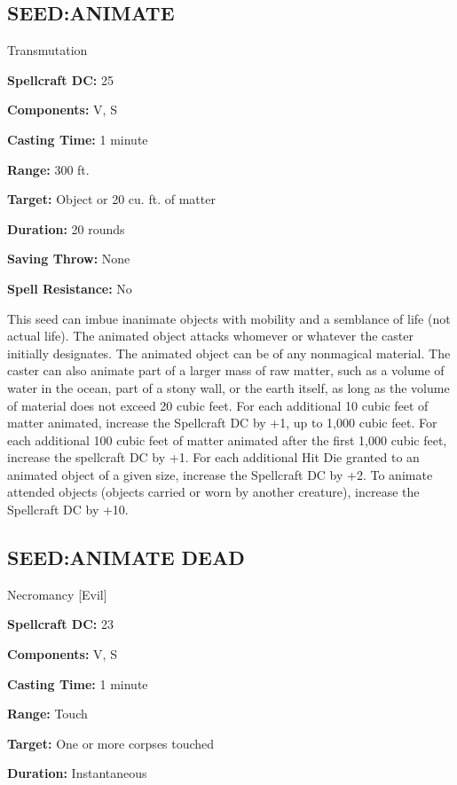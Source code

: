 \documentclass{article}
\begin{document}
\vspace{12pt}
\subsection*{SEED:ANIMATE }

Transmutation 

\textbf{Spellcraft DC:} 25 

\textbf{Components:} V, S 

\textbf{Casting Time:} 1 minute 

\textbf{Range:} 300 ft. 

\textbf{Target:} Object or 20 cu. ft. of matter 

\textbf{Duration:} 20 rounds 

\textbf{Saving Throw:} None 

\textbf{Spell Resistance:} No 

This seed can imbue inanimate objects with mobility and a semblance of life (not 
actual life). The animated object attacks whomever or whatever the caster initially 
designates. The animated object can be of any nonmagical material. The caster can 
also animate part of a larger mass of raw matter, such as a volume of water in 
the ocean, part of a stony wall, or the earth itself, as long as the volume of 
material does not exceed 20 cubic feet. For each additional 10 cubic feet of matter 
animated, increase the Spellcraft DC by +1, up to 1,000 cubic feet. For each additional 
100 cubic feet of matter animated after the first 1,000 cubic feet, increase the 
spellcraft DC by +1. For each additional Hit Die granted to an animated object 
of a given size, increase the Spellcraft DC by +2. To animate attended objects 
(objects carried or worn by another creature), increase the Spellcraft DC by +10. 

\vspace{12pt}
\subsection*{SEED:ANIMATE DEAD }

Necromancy [Evil] 

\textbf{Spellcraft DC:} 23 

\textbf{Components:} V, S 

\textbf{Casting Time:} 1 minute 

\textbf{Range:} Touch 

\textbf{Target:} One or more corpses touched 

\textbf{Duration:} Instantaneous 
\end{document}
